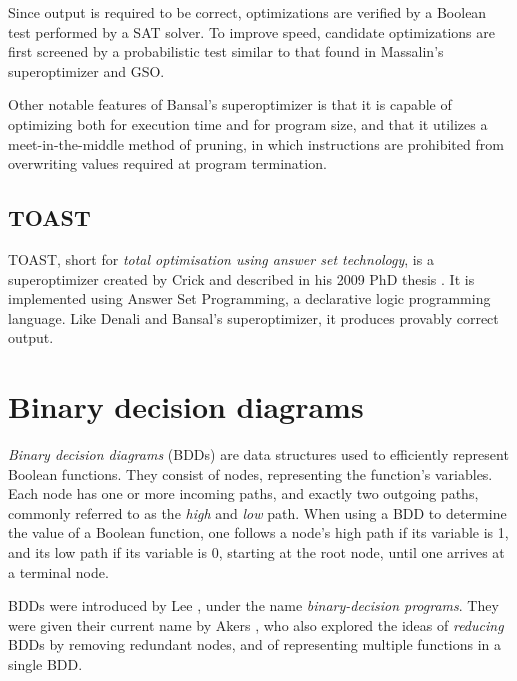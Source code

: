 \documentclass[a4paper,11pt]{kth-mag}
\begin{document}
Since output is required to be correct, optimizations are verified by a Boolean test performed by a SAT solver.
To improve speed, candidate optimizations are first screened by a probabilistic test similar to that found in Massalin's superoptimizer and GSO.

Other notable features of Bansal's superoptimizer is that it is capable of optimizing both for execution time and for program size, and that it utilizes a meet-in-the-middle method of pruning, in which instructions are prohibited from overwriting values required at program termination.

\subsection{TOAST}

TOAST, short for \emph{total optimisation using answer set technology}, is a superoptimizer created by Crick and described in his 2009 PhD thesis \cite{crick_thesis}.
It is implemented using Answer Set Programming, a declarative logic programming language.
Like Denali and Bansal's superoptimizer, it produces provably correct output.

%

\section{Binary decision diagrams}

\emph{Binary decision diagrams} (BDDs) are data structures used to efficiently represent Boolean functions.
They consist of nodes, representing the function's variables. Each node has one or more incoming paths, and exactly two outgoing paths, commonly referred to as the \emph{high} and \emph{low} path.
When using a BDD to determine the value of a Boolean function, one follows a node's high path if its variable is 1, and its low path if its variable is 0, starting at the root node, until one arrives at a terminal node.

BDDs were introduced by Lee \cite{lee59}, under the name \emph{binary-decision programs}.
They were given their current name by Akers \cite{akers78}, who also explored the ideas of \emph{reducing} BDDs by removing redundant nodes, and of representing multiple functions in a single BDD.
\end{document}
